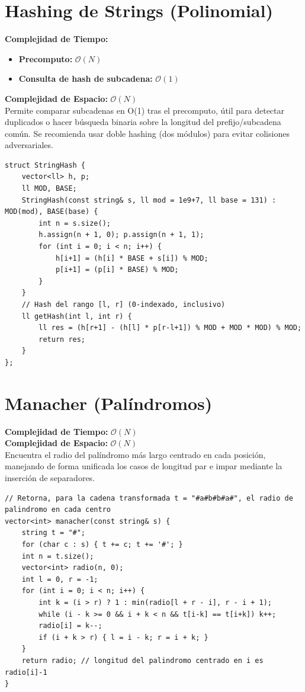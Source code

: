 \documentclass[10pt,twocolumn,letterpaper]{report}
\begin{document}
\section{Hashing de Strings (Polinomial)}
\textbf{Complejidad de Tiempo:}
\begin{itemize}
    \item \textbf{Precomputo:} $\mathcal{O}(N)$
    \item \textbf{Consulta de hash de subcadena:} $\mathcal{O}(1)$
\end{itemize}
\textbf{Complejidad de Espacio:} $\mathcal{O}(N)$ \\
Permite comparar subcadenas en O(1) tras el precomputo, útil para detectar duplicados o hacer búsqueda binaria sobre la longitud del prefijo/subcadena común. Se recomienda usar doble hashing (dos módulos) para evitar colisiones adversariales.
\begin{lstlisting}
struct StringHash {
    vector<ll> h, p;
    ll MOD, BASE;
    StringHash(const string& s, ll mod = 1e9+7, ll base = 131) : MOD(mod), BASE(base) {
        int n = s.size();
        h.assign(n + 1, 0); p.assign(n + 1, 1);
        for (int i = 0; i < n; i++) {
            h[i+1] = (h[i] * BASE + s[i]) % MOD;
            p[i+1] = (p[i] * BASE) % MOD;
        }
    }
    // Hash del rango [l, r] (0-indexado, inclusivo)
    ll getHash(int l, int r) {
        ll res = (h[r+1] - (h[l] * p[r-l+1]) % MOD + MOD * MOD) % MOD;
        return res;
    }
};
\end{lstlisting}
\section{Manacher (Palíndromos)}
\textbf{Complejidad de Tiempo:} $\mathcal{O}(N)$ \\
\textbf{Complejidad de Espacio:} $\mathcal{O}(N)$ \\
Encuentra el radio del palíndromo más largo centrado en cada posición, manejando de forma unificada los casos de longitud par e impar mediante la inserción de separadores.
\begin{lstlisting}
// Retorna, para la cadena transformada t = "#a#b#b#a#", el radio de palindromo en cada centro
vector<int> manacher(const string& s) {
    string t = "#";
    for (char c : s) { t += c; t += '#'; }
    int n = t.size();
    vector<int> radio(n, 0);
    int l = 0, r = -1;
    for (int i = 0; i < n; i++) {
        int k = (i > r) ? 1 : min(radio[l + r - i], r - i + 1);
        while (i - k >= 0 && i + k < n && t[i-k] == t[i+k]) k++;
        radio[i] = k--;
        if (i + k > r) { l = i - k; r = i + k; }
    }
    return radio; // longitud del palindromo centrado en i es radio[i]-1
}
\end{lstlisting}
\end{document}
